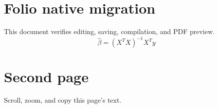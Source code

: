 \documentclass{article}
\begin{document}
\section{Folio native migration}
This document verifies editing, saving, compilation, and PDF preview.
\[ \hat\beta = (X^T X)^{-1}X^T y \]
\newpage
\section{Second page}
Scroll, zoom, and copy this page's text.
\end{document}
